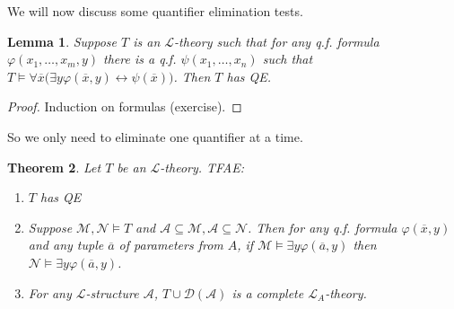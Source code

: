 \documentclass[]{article}
\theoremstyle{custhm}
\newtheorem{theorem}{Theorem}[section]
\theoremstyle{cusdef}
\theoremstyle{custhm}
\newtheorem{lemma}[theorem]{Lemma}
\theoremstyle{custhm}
\theoremstyle{custhm}
\theoremstyle{ex}
\theoremstyle{custhm}
\theoremstyle{cusdef}
\theoremstyle{remark}
\theoremstyle{remark}
\theoremstyle{numremark}
\renewcommand{\L}{\mathcal{L}}
\newcommand{\M}{\mathcal{M}}
\renewcommand{\phi}{\varphi}
\renewcommand{\bar}{\overline}
\newcommand{\N}{\mathcal{N}}
\newcommand{\A}{\mathcal{A}}
\renewcommand{\subset}{\subseteq}
\begin{document}
We will now discuss some quantifier elimination tests.

\begin{lemma}
Suppose $T$ is an $\L$-theory such that for any q.f. formula $\phi(x_1,\dots,x_m,y)$ there is a q.f. $\psi(x_1,\dots,x_n)$ such that $T\models \forall \bar{x}\big(\exists y \phi(\bar{x},y)\leftrightarrow \psi(\bar{x})\big)$. Then $T$ has QE.
\end{lemma}
\begin{proof}
Induction on formulas (exercise).
\end{proof}

So we only need to eliminate one quantifier at a time.

\begin{theorem}
Let $T$ be an $\L$-theory. TFAE:
\begin{enumerate}[label=\roman*)]
	\item $T$ has QE
	\item Suppose $\M,\N\models T$ and $\A\subset\M,\A\subset\N$. Then for any q.f. formula $\phi(\bar{x},y)$ and any tuple $\bar{a}$ of parameters from $A$, if $\M\models \exists y\phi(\bar{a},y)$ then $\N\models \exists y \phi(\bar{a},y)$.
	\item For any $\L$-structure $\A$, $T\cup \mathcal{D}(\A)$ is a complete $\L_A$-theory.
\end{enumerate}
\end{theorem}
\end{document}
